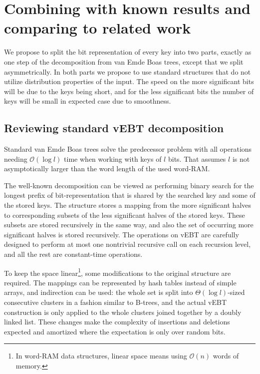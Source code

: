 \documentclass[
submission
]{dmtcs-episciences}
\theoremstyle{plain}
\theoremstyle{definition}
\theoremstyle{remark}
\theoremstyle{plain}
\theoremstyle{plain}
\def\OO{\mathcal O}
\begin{document}

\section{Combining with known results and comparing to related work \label{sec:main-results}}

We propose to split the bit representation of every key into two parts,
exactly as one step of the decomposition from van Emde Boas trees,
except that we split asymmetrically. In both parts we propose to use
standard structures that do not utilize distribution properties of
the input. The speed on the more significant bits will be due to the
keys being short, and for the less significant bits the number of
keys will be small in expected case due to smoothness.

\subsection{Reviewing standard vEBT decomposition}

Standard van Emde Boas trees solve the predecessor problem with all
operations needing $\OO(\log l)$ time when working with keys of $l$
bits. That assumes $l$ is not asymptotically larger than the word
length of the used word-RAM.

The well-known decomposition can be viewed as performing binary search
for the longest prefix of bit-representation that is shared by the
searched key and some of the stored keys. The structure stores a mapping
from the more significant halves to corresponding subsets of the less
significant halves of the stored keys. These subsets are stored recursively
in the same way, and also the set of occurring more significant halves
is stored recursively. The operations on vEBT are carefully designed
to perform at most one nontrivial recursive call on each recursion
level, and all the rest are constant-time operations.

To keep the space linear\footnote{In word-RAM data structures, linear space means using $\OO(n)$ words
of memory.}, some modifications to the original structure are required. The mappings
can be represented by hash tables instead of simple arrays, and indirection
can be used: the whole set is split into $\Theta(\log l)$-sized consecutive
clusters in a fashion similar to B-trees, and the actual vEBT construction
is only applied to the whole clusters joined together by a doubly
linked list. These changes make the complexity of insertions and deletions
expected and amortized where the expectation is only over random bits.
\end{document}
